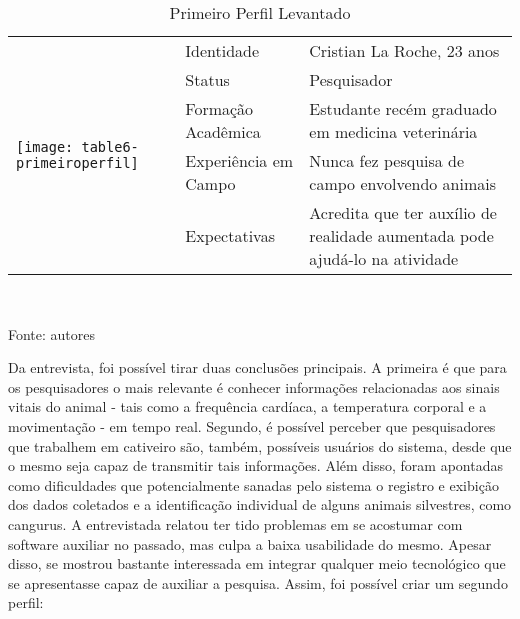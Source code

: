 \begin{table}[ht]
\centering
\caption{Primeiro Perfil Levantado}
\vspace{0.5cm}
\begin{tabular}{| l | l | m{8cm} |}
\hline
\multirow{5}{*}{\texttt{[image: table6-primeiroperfil]}} & Identidade & Cristian La Roche, 23 anos\\ \cline{2-3}
& Status & Pesquisador\\%
& Formação Acadêmica & Estudante recém graduado em medicina veterinária\\ %
& Experiência em Campo & Nunca fez pesquisa de campo envolvendo animais\\ %
& Expectativas & Acredita que ter auxílio de realidade aumentada pode ajudá-lo na atividade\\ %
\hline
\end{tabular}
\vspace{0.4cm}\\
\centerline{\small{Fonte: autores}}
\end{table}



Da entrevista, foi possível tirar duas conclusões principais. A primeira é que para os pesquisadores o mais relevante é conhecer informações relacionadas aos sinais vitais do animal - tais como a frequência cardíaca, a temperatura corporal e a movimentação - em tempo real. Segundo, é possível perceber que pesquisadores que trabalhem em cativeiro são, também, possíveis usuários do sistema, desde que o mesmo seja capaz de transmitir tais informações.
Além disso, foram apontadas como dificuldades que potencialmente sanadas pelo sistema o registro e exibição dos dados coletados e a identificação individual de alguns animais silvestres, como cangurus.
A entrevistada relatou ter tido problemas em se acostumar com software auxiliar no passado, mas culpa a baixa usabilidade do mesmo. Apesar disso, se mostrou bastante interessada em integrar qualquer meio tecnológico que se apresentasse capaz de auxiliar a pesquisa.
Assim, foi possível criar um segundo perfil:

